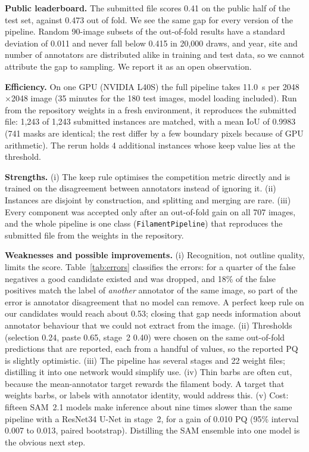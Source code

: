 \documentclass[sigconf]{acmart}
\begin{document}
\textbf{Public leaderboard.} The submitted file scores 0.41 on the public half of the test set, against 0.473 out of fold. We see the same gap for every version of the pipeline. Random 90-image subsets of the out-of-fold results have a standard deviation of 0.011 and never fall below 0.415 in 20,000 draws, and year, site and number of annotators are distributed alike in training and test data, so we cannot attribute the gap to sampling. We report it as an open observation.

\textbf{Efficiency.} On one GPU (NVIDIA L40S) the full pipeline takes 11.0~s per 2048$\times$2048 image (35 minutes for the 180 test images, model loading included). Run from the repository weights in a fresh environment, it reproduces the submitted file: 1,243 of 1,243 submitted instances are matched, with a mean IoU of 0.9983 (741 masks are identical; the rest differ by a few boundary pixels because of GPU arithmetic). The rerun holds 4 additional instances whose keep value lies at the threshold.

\textbf{Strengths.} (i) The keep rule optimises the competition metric directly and is trained on the disagreement between annotators instead of ignoring it. (ii) Instances are disjoint by construction, and splitting and merging are rare. (iii) Every component was accepted only after an out-of-fold gain on all 707 images, and the whole pipeline is one class (\texttt{FilamentPipeline}) that reproduces the submitted file from the weights in the repository.

\textbf{Weaknesses and possible improvements.} (i) Recognition, not outline quality, limits the score. Table~\ref{tab:errors} classifies the errors: for a quarter of the false negatives a good candidate existed and was dropped, and 18\% of the false positives match the label of \emph{another} annotator of the same image, so part of the error is annotator disagreement that no model can remove. A perfect keep rule on our candidates would reach about 0.53; closing that gap needs information about annotator behaviour that we could not extract from the image. (ii) Thresholds (selection 0.24, paste 0.65, stage~2 0.40) were chosen on the same out-of-fold predictions that are reported, each from a handful of values, so the reported PQ is slightly optimistic. (iii) The pipeline has several stages and 22 weight files; distilling it into one network would simplify use. (iv) Thin barbs are often cut, because the mean-annotator target rewards the filament body. A target that weights barbs, or labels with annotator identity, would address this. (v) Cost: fifteen SAM~2.1 models make inference about nine times slower than the same pipeline with a ResNet34 U-Net in stage~2, for a gain of 0.010 PQ (95\% interval 0.007 to 0.013, paired bootstrap). Distilling the SAM ensemble into one model is the obvious next step.
\end{document}
